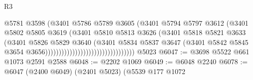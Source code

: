 \begin{lexlean}{R3}
\begin{coremodule}
                                                      @5781
                                                      @3598
                                                      (@3401
                                                        @5786
                                                        @5789
                                                        @3605
                                                        (@3401
                                                          @5794
                                                          @5797
                                                          @3612
                                                          (@3401
                                                            @5802
                                                            @5805
                                                            @3619
                                                            (@3401
                                                              @5810
                                                              @5813
                                                              @3626
                                                              (@3401
                                                                @5818
                                                                @5821
                                                                @3633
                                                                (@3401
                                                                  @5826
                                                                  @5829
                                                                  @3640
                                                                  (@3401
                                                                    @5834
                                                                    @5837
                                                                    @3647
                                                                    (@3401
                                                                      @5842
                                                                      @5845
                                                                      @3654
                                                                      @3656)))))))))))))))))))))))))))))))))
    @5023
@6047 := @3698 @5522 @661 @1073 @2591 @2588
@6048 := @2202 @1069
@6049 := @6048 @2240
@6078 := @6047
    (@2400 @6049)
    (@2401 @5023)
    (@5539
      @177
      @1072

\end{coremodule}
\end{lexlean}
